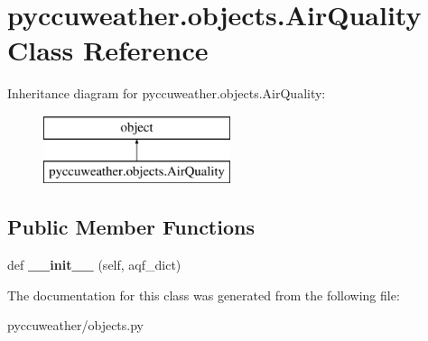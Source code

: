 \hypertarget{classpyccuweather_1_1objects_1_1_air_quality}{}\section{pyccuweather.\+objects.\+Air\+Quality Class Reference}
\label{classpyccuweather_1_1objects_1_1_air_quality}
Inheritance diagram for pyccuweather.\+objects.\+Air\+Quality\+:\begin{figure}[H]
\begin{center}
\leavevmode
\includegraphics[height=2.000000cm]{classpyccuweather_1_1objects_1_1_air_quality}
\end{center}
\end{figure}
\subsection*{Public Member Functions}
\begin{DoxyCompactItemize}
\item 
\hypertarget{classpyccuweather_1_1objects_1_1_air_quality_aa7e6eba5756b729f13b89532a00cff31}{}def {\bfseries \+\_\+\+\_\+init\+\_\+\+\_\+} (self, aqf\+\_\+dict)\label{classpyccuweather_1_1objects_1_1_air_quality_aa7e6eba5756b729f13b89532a00cff31}

\end{DoxyCompactItemize}


The documentation for this class was generated from the following file\+:\begin{DoxyCompactItemize}
\item 
pyccuweather/objects.\+py\end{DoxyCompactItemize}
